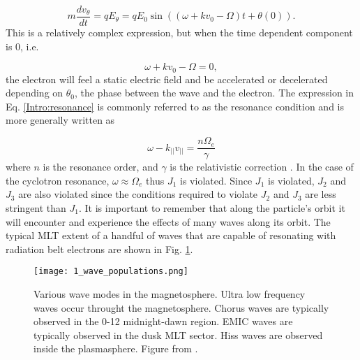 \begin{equation}
m \frac{dv_\theta}{dt} = qE_\theta = qE_0 \sin{((\omega + kv_0 - \Omega)t + \theta(0))}.
\end{equation} This is a relatively complex expression, but when the time dependent component is 0, i.e. 

\begin{equation} \label{Intro:resonance}
\omega + kv_0 - \Omega = 0,
\end{equation} the electron will feel a static electric field and be accelerated or decelerated depending on $\theta_0$, the phase between the wave and the electron. The expression in Eq. \ref{Intro:resonance} is commonly referred to as the resonance condition and is more generally written as 

\begin{equation} \label{Intro:resonance_general}
\omega - k_{||} v_{||} = \frac{n \Omega_e}{\gamma}
\end{equation} where $n$ is the resonance order, and $\gamma$ is the relativistic correction \citep[e.g.][]{Millan2007}. In the case of the cyclotron resonance, $\omega \approx \Omega_e$ thus $J_1$ is violated. Since $J_1$ is violated, $J_2$ and $J_3$ are also violated since the conditions required to violate $J_2$ and $J_3$ are less stringent than $J_1$. It is important to remember that along the particle's orbit it will encounter and experience the effects of many waves along its orbit. The typical MLT extent of a handful of waves that are capable of resonating with radiation belt electrons are shown in Fig. \ref{Intro:waves}.

\begin{figure}
\texttt{[image: 1\_wave\_populations.png]}
\caption{Various wave modes in the magnetosphere. Ultra low frequency waves occur throught the magnetosphere. Chorus waves are typically observed in the 0-12 midnight-dawn region. EMIC waves are typically observed in the dusk MLT sector. Hiss waves are observed inside the plasmasphere. Figure from \citet{Millan2007}.}
\label{Intro:waves}
\end{figure}

